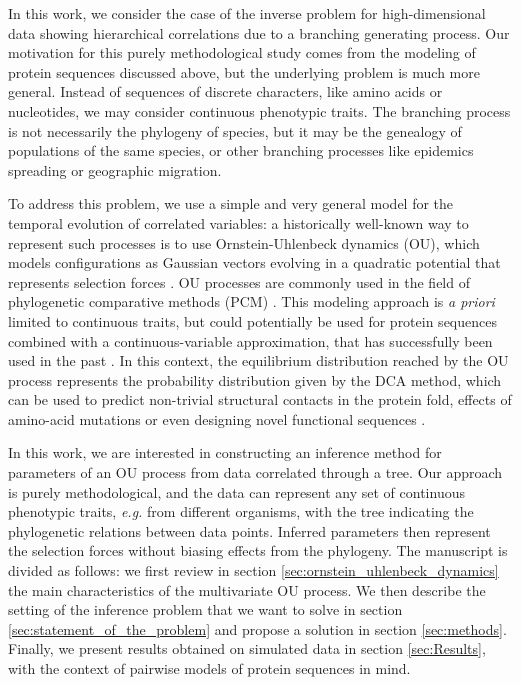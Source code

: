 \documentclass[preprint,amsmath,amssymb,superscriptaddress,showpacs,pre]{revtex4-1}
\begin{document}
In this work, we consider the case of the inverse problem for high-dimensional data showing hierarchical correlations due to a branching generating process.
Our motivation for this purely methodological study comes from the modeling of protein sequences discussed above, but the underlying problem is much more general. 
Instead of sequences of discrete characters, like amino acids or nucleotides, we may consider continuous phenotypic traits. 
The branching process is not necessarily the phylogeny of species, but it may be the genealogy of populations of the same species, or other branching processes like epidemics spreading or geographic migration.

To address this problem, we use a simple and very general model for the temporal evolution of correlated variables: a historically well-known way to represent such processes is to use Ornstein-Uhlenbeck dynamics (OU), which models configurations as Gaussian vectors evolving in a quadratic potential that represents selection forces \cite{uhlenbeck_theory_1930, felsenstein_phylogenies_1988, hansen_stabilizing_1997}.
OU processes are commonly used in the field of phylogenetic comparative methods (PCM) \cite{bartoszek_phylogenetic_2012,mitov_fast_2020}. 
This modeling approach is \emph{a priori} limited to continuous traits, but could potentially be used for protein sequences combined with a continuous-variable approximation, that has successfully been used in the past \cite{jones_psicov_2012,barton_large_2014,baldassi_fast_2014}. 
In this context, the equilibrium distribution reached by the OU process represents the probability distribution given by the DCA method, which can be used to predict non-trivial structural contacts in the protein fold, effects of amino-acid mutations or even designing novel functional sequences \cite{morcos_direct-coupling_2011, figliuzzi_coevolutionary_2016, russ_evolution-based_2020}. 


In this work, we are interested in constructing an inference method for parameters of an OU process from data correlated through a tree.
Our approach is purely methodological, and the data can represent any set of continuous phenotypic traits, \emph{e.g.} from different organisms, with the tree indicating the phylogenetic relations between data points. 
Inferred parameters then represent the selection forces without biasing effects from the phylogeny. 
The manuscript is divided as follows: we first review in section \ref{sec:ornstein_uhlenbeck_dynamics} the main characteristics of the multivariate OU process. 
We then describe the setting of the inference problem that we want to solve in section \ref{sec:statement_of_the_problem} and propose a solution in section \ref{sec:methods}.
Finally, we present results obtained on simulated data in section \ref{sec:Results}, with the context of pairwise models of protein sequences in mind. 
\end{document}
